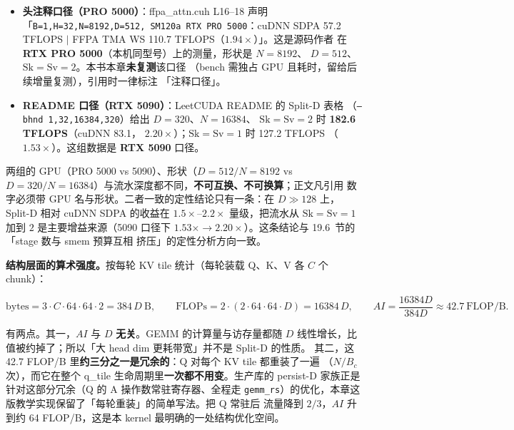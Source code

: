 \begin{itemize}[itemsep=2pt,topsep=2pt]
  \item \textbf{头注释口径（PRO 5000）}：ffpa\_attn.cuh L16--18 声明
        「\texttt{B=\allowbreak{}1,\allowbreak{}H=\allowbreak{}32,\allowbreak{}N=\allowbreak{}8192,\allowbreak{}D=\allowbreak{}512,\allowbreak{} SM120a RTX PRO 5000}：cuDNN SDPA
        57.2 TFLOPS $|$ FFPA TMA WS 110.7 TFLOPS（$1.94\times$）」。这是源码作者
        在\textbf{RTX PRO 5000}（本机同型号）上的测量，形状是 $N{=}8192$、
        $D{=}512$、$\mathrm{Sk}=\mathrm{Sv}=2$。本书本章\textbf{未复测}该口径
        （bench 需独占 GPU 且耗时，留给后续增量复测），引用时一律标注
        「注释口径」。
  \item \textbf{README 口径（RTX 5090）}：LeetCUDA README 的 Split-D 表格
        （\texttt{--bhnd 1,\allowbreak{}32,\allowbreak{}16384,\allowbreak{}320}）给出 $D{=}320$、$N{=}16384$、
        $\mathrm{Sk}=\mathrm{Sv}=2$ 时 \textbf{182.6 TFLOPS}（cuDNN 83.1，
        $2.20\times$）；$\mathrm{Sk}=\mathrm{Sv}=1$ 时 127.2 TFLOPS
        （$1.53\times$）。这组数据是 \textbf{RTX 5090} 口径。
\end{itemize}

两组的 GPU（PRO 5000 vs 5090）、形状（$D{=}512/N{=}8192$ vs
$D{=}320/N{=}16384$）与流水深度都不同，\textbf{不可互换、不可换算}；正文凡引用
数字必须带 GPU 名与形状。二者一致的定性结论只有一条：在 $D \gg 128$ 上，
Split-D 相对 cuDNN SDPA 的收益在 $1.5\times$--$2.2\times$ 量级，把流水从
$\mathrm{Sk}{=}\mathrm{Sv}{=}1$ 加到 $2$ 是主要增益来源（5090 口径下
$1.53\times \to 2.20\times$）。这条结论与 19.6~节的「stage 数与 smem 预算互相
挤压」的定性分析方向一致。

\textbf{结构层面的算术强度。}按每轮 KV tile 统计（每轮装载 Q、K、V 各 $C$ 个 chunk）：

\begin{equation}
  \mathrm{bytes} = 3 \cdot C \cdot 64 \cdot 64 \cdot 2 = 384\,D\ \text{B} ,
  \qquad
  \mathrm{FLOPs} = 2\cdot(2 \cdot 64 \cdot 64 \cdot D) = 16384\,D ,
  \qquad
  AI = \frac{16384D}{384D} \approx 42.7\ \text{FLOP/B} .
  \label{eq:19-ai}
\end{equation}

有两点。其一，$AI$ 与 $D$ \textbf{无关}。GEMM 的计算量与访存量都随
$D$ 线性增长，比值被约掉了；所以「大 head dim 更耗带宽」并不是 Split-D 的性质。
其二，这 42.7 FLOP/B 里\textbf{约三分之一是冗余的}：Q 对每个 KV tile 都重装了一遍
（$N/B_c$ 次），而它在整个 q\_tile 生命周期里\textbf{一次都不用变}。生产库的
persist-D 家族正是针对这部分冗余（Q 的 A 操作数常驻寄存器、全程走
\texttt{gemm\_rs}）的优化，本章这版教学实现保留了「每轮重装」的简单写法。把 Q 常驻后
流量降到 $2/3$，$AI$ 升到约 64 FLOP/B，这是本 kernel 最明确的一处结构优化空间。

